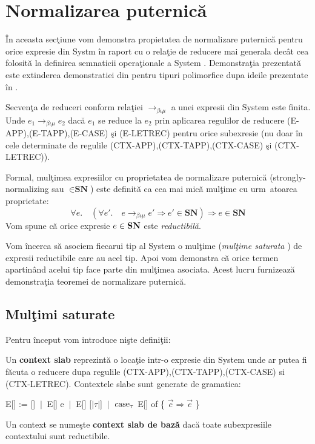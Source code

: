 \section{Normalizarea puternic\u a}

\^ In aceasta sec\c tiune vom demonstra propietatea de normalizare puternic\u a pentru orice expresie din Systm \fhat \^ in raport cu o rela\c tie de reducere mai generala dec\^ at cea folosit\u a la definirea semnaticii opera\c tionale a System \fhat. Demonstra\c tia prezentat\u a este extinderea demonstratiei din \citep{967408} pentru tipuri polimorfice dupa ideile prezentate \^ in \citep{1614481}.

\begin{theorem}
Secven\c ta de reduceri conform rela\c tiei $\to_{\beta\iota\mu}$ a unei expresii din System \fhat este finita. Unde $e_1 \to_{\beta\iota\mu} e_2$ dac\u a $e_1$ se reduce la $e_2$ prin aplicarea regulilor de reducere {\scriptsize (E-APP),(E-TAPP),(E-CASE)} \c si {\scriptsize (E-LETREC)} pentru orice subexresie (nu doar \^ in cele determinate de regulile {\scriptsize (CTX-APP),(CTX-TAPP),(CTX-CASE)} \c si {\scriptsize  (CTX-LETREC)}).
\end{theorem}

Formal, mul\c timea expresiilor cu proprietatea de normalizare puternic\u a (strongly-normalizing sau $\in \textbf{SN}$) este definit\u a ca cea mai mic\u a mul\c time cu urm\ atoarea proprietate:
\begin{equation}
    \forall e . \quad (\forall e'. \quad e \to_{\beta\iota\mu} e' \Rightarrow e' \in {\textbf{SN}} ) \Rightarrow  e \in {\textbf{SN}}
\end{equation}
Vom spune c\u a orice expresie $e \in {\bf SN}$ este \emph{reductibil\u a}.

Vom \^ incerca s\u a asociem fiecarui tip al System \fhat o mul\c time (\emph{mul\c time saturata} \citep{967408}) de expresii reductibile care au acel tip. Apoi vom demonstra c\u a orice termen apartin\^ and acelui tip face parte din mul\c timea asociata. Acest lucru furnizeaz\u a demonstra\c tia teoremei de normalizare puternic\u a.

\subsection{Mul\c timi saturate}

Pentru \^ inceput vom introduce ni\c ste defini\c tii:
\begin{definition}
Un {\bf context slab} reprezint\u a o loca\c tie intr-o expresie din System \fhat unde ar putea fi f\u acuta o reducere dupa regulile {\scriptsize (CTX-APP),(CTX-TAPP),(CTX-CASE)} si {\scriptsize  (CTX-LETREC)}. Contextele slabe sunt generate de gramatica:
\begin{center}
E[] :=  []   $\:|\:$   E[] e   $\:|\:$   E[] [$|\tau|$]   $\:|\:$   $\text{\emph case}_\tau$ E[] of \{ $\vec{c} \Rightarrow \vec{e}$ \}
\end{center}
Un context se nume\c ste {\bf context slab de baz\u a} dac\u a toate subexpresiile contextului sunt reductibile.
\end{definition}


